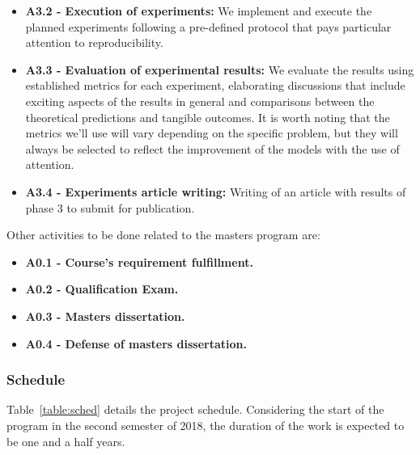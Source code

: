 \documentclass[12pt]{article}
\begin{document}
\begin{itemize}
    \item \textbf{A3.2 - Execution of experiments:}
        We implement and execute the planned experiments following a pre-defined protocol that
        pays particular attention to reproducibility.

    \item \textbf{A3.3 - Evaluation of experimental results:}
        We evaluate the results using established metrics for each experiment,
        elaborating discussions that include exciting aspects of the results in general and
        comparisons between the theoretical predictions and tangible outcomes.
        It is worth noting that the metrics we'll use will vary depending on the specific problem,
        but they will always be selected to reflect the improvement of the models with the use of
        attention.

    \item \textbf{A3.4 - Experiments article writing:}
        Writing of an article with results of phase $3$ to submit for publication.
\end{itemize}

Other activities to be done related to the masters program are:
\begin{itemize}
    \item \textbf{A0.1 - Course's requirement fulfillment.}
    \item \textbf{A0.2 - Qualification Exam.}
    \item \textbf{A0.3 - Masters dissertation.}
    \item \textbf{A0.4 - Defense of masters dissertation.}
\end{itemize}

\subsubsection{Schedule}
Table~\ref{table:sched} details the project schedule.
Considering the start of the program in the second semester of 2018, the duration of the work is expected to be
one and a half years.
\end{document}
